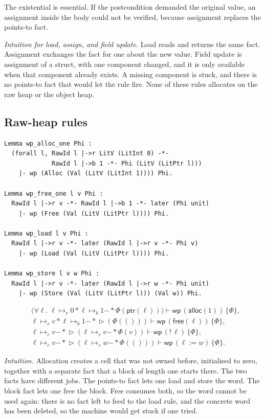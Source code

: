 \documentclass[11pt]{article}
\newcommand{\Unit}{\mathsf{()}}
\newcommand{\ptsr}{\mathrel{\mapsto_{r}}}
\newcommand{\ptsb}{\mathrel{\mapsto_{b}}}
\newcommand{\sep}{\mathbin{*}}
\newcommand{\wand}{\mathbin{-\!\!*}}
\newcommand{\later}{\mathop{\triangleright}}
\newcommand{\Wpre}{\mathsf{wp}}
\begin{document}
The existential is essential.
If the postcondition demanded the original value, an assignment inside the body could not be verified, because assignment replaces the points-to fact.

\textit{Intuition for load, assign, and field update.}
Load reads and returns the same fact.
Assignment exchanges the fact for one about the new value.
Field update is assignment of a struct, with one component changed, and it is only available when that component already exists.
A missing component is stuck, and there is no points-to fact that would let the rule fire.
None of these rules allocates on the raw heap or the object heap.

\subsection{Raw-heap rules}

\begin{lstlisting}
Lemma wp_alloc_one Phi :
  (forall l, RawId l |->r LitV (LitInt 0) -*-
             RawId l |->b 1 -*- Phi (LitV (LitPtr l)))
    |- wp (Alloc (Val (LitV (LitInt 1)))) Phi.

Lemma wp_free_one l v Phi :
  RawId l |->r v -*- RawId l |->b 1 -*- later (Phi unit)
    |- wp (Free (Val (LitV (LitPtr l)))) Phi.

Lemma wp_load l v Phi :
  RawId l |->r v -*- later (RawId l |->r v -*- Phi v)
    |- wp (Load (Val (LitV (LitPtr l)))) Phi.

Lemma wp_store l v w Phi :
  RawId l |->r v -*- later (RawId l |->r w -*- Phi unit)
    |- wp (Store (Val (LitV (LitPtr l))) (Val w)) Phi.
\end{lstlisting}

\begin{align*}
&\bigl(\forall \ell.\;
   \ell \ptsr 0 \sep \ell \ptsb 1 \wand \Phi(\mathsf{ptr}(\ell))\bigr)
  \vdash
  \Wpre\,(\mathsf{alloc}(1))\,\{\Phi\},\\
&\ell \ptsr v \sep \ell \ptsb 1 \wand \later(\Phi(\Unit))
  \vdash
  \Wpre\,(\mathsf{free}(\ell))\,\{\Phi\},\\
&\ell \ptsr v \wand \later(\ell \ptsr v \wand \Phi(v))
  \vdash
  \Wpre\,({!}\,\ell)\,\{\Phi\},\\
&\ell \ptsr v \wand \later(\ell \ptsr w \wand \Phi(\Unit))
  \vdash
  \Wpre\,(\ell := w)\,\{\Phi\}.
\end{align*}

\textit{Intuition.}
Allocation creates a cell that was not owned before, initialised to zero, together with a separate fact that a block of length one starts there.
The two facts have different jobs.
The points-to fact lets one load and store the word.
The block fact lets one free the block.
Free consumes both, so the word cannot be used again: there is no fact left to feed to the load rule, and the concrete word has been deleted, so the machine would get stuck if one tried.
\end{document}
